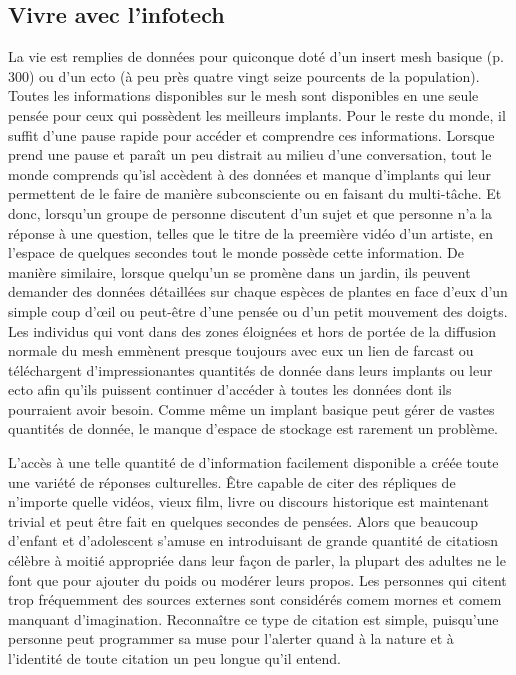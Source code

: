       \subsection{Vivre avec l'infotech} \label{sec:living-with-infotech} 

      La vie est remplies de données pour quiconque doté d'un insert mesh basique (p. 300) ou d'un ecto (à peu près quatre vingt seize pourcents de la population). Toutes les informations disponibles sur le mesh sont disponibles en une seule pensée pour ceux qui possèdent les meilleurs implants. Pour le reste du monde, il suffit d'une pause rapide pour accéder et comprendre ces informations. Lorsque prend une pause et paraît un peu distrait au milieu d'une conversation, tout le monde comprends qu'isl accèdent à des données et manque d'implants qui leur permettent de le faire de manière subconsciente ou en faisant du multi-tâche. Et donc, lorsqu'un groupe de personne discutent d'un sujet et que personne n'a la réponse à une question, telles que le titre de la preemière vidéo d'un artiste, en l'espace de quelques secondes tout le monde possède cette information. De manière similaire, lorsque quelqu'un se promène dans un jardin, ils peuvent demander des données détaillées sur chaque espèces de plantes en face d'eux d'un  simple coup d'œil ou peut-être d'une pensée ou d'un petit mouvement des doigts. Les individus qui vont dans des zones éloignées et hors de portée de la diffusion normale du mesh emmènent presque toujours avec eux un lien de farcast ou téléchargent d'impressionantes quantités de donnée dans leurs implants ou leur ecto afin qu'ils puissent continuer d'accéder à toutes les données dont ils pourraient avoir besoin. Comme même un implant basique peut gérer de vastes quantités de donnée, le manque d'espace de stockage est rarement un problème. 

      L'accès à une telle quantité de d'information facilement disponible a créée toute une variété de réponses culturelles. Être capable de citer des répliques de n'importe quelle vidéos, vieux film, livre ou discours historique est maintenant trivial et peut être fait en quelques secondes de pensées. Alors que beaucoup d'enfant et d'adolescent s'amuse en introduisant de grande quantité de citatiosn célèbre à moitié appropriée dans leur façon de parler, la plupart des adultes ne le font que pour ajouter du poids ou modérer leurs propos. Les personnes qui citent trop fréquemment des sources externes sont considérés comem mornes et comem manquant d'imagination. Reconnaître ce type de citation est simple, puisqu'une personne peut programmer sa muse pour l'alerter quand à la nature et à l'identité de toute citation un peu longue qu'il entend. 

